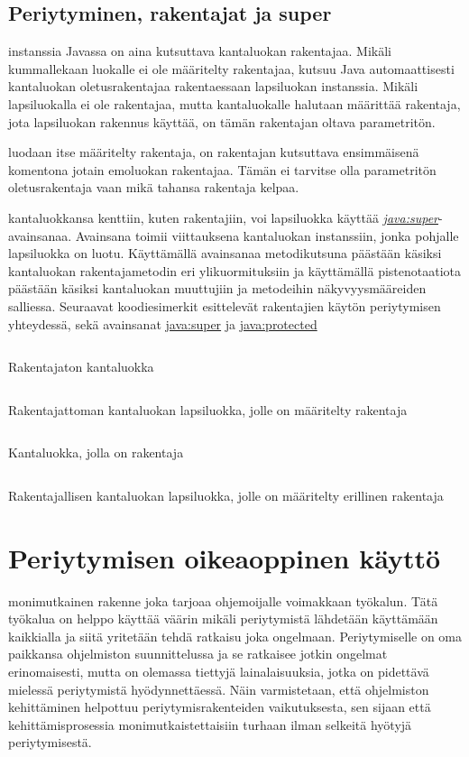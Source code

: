 \documentclass{tufte-book}
\newcommand{\java}[1]{\underline{\gls{java:#1}}}
\newcommand{\newjava}[1]{\textit{\java{#1}}}
\newcommand{\code}[3]{
\begin{listing}
    \inputminted{java}{OhjelmointiopasEsimerkit/src/#1/#2.java}
    \caption{#3}
    \label{Java-#1-#2}
\end{listing}
}
\begin{document}
\subsection{Periytyminen, rakentajat ja super}
\label{super}

 instanssia Javassa on aina kutsuttava kantaluokan rakentajaa.
Mikäli kummallekaan luokalle ei ole määritelty rakentajaa, kutsuu Java automaattisesti kantaluokan
oletusrakentajaa rakentaessaan lapsiluokan instanssia. Mikäli lapsiluokalla ei ole rakentajaa,
mutta kantaluokalle halutaan määrittää rakentaja, jota lapsiluokan rakennus käyttää, on tämän
rakentajan oltava parametritön.

 luodaan itse määritelty rakentaja, on rakentajan kutsuttava
ensimmäisenä komentona jotain emoluokan rakentajaa. Tämän ei tarvitse olla parametritön
oletusrakentaja vaan mikä tahansa rakentaja kelpaa.

 kantaluokkansa kenttiin, kuten rakentajiin, voi lapsiluokka
käyttää \newjava{super}-avainsanaa. Avainsana toimii viittauksena kantaluokan instanssiin, jonka
pohjalle lapsiluokka on luotu. Käyttämällä avainsanaa metodikutsuna päästään käsiksi kantaluokan
rakentajametodin eri ylikuormituksiin ja käyttämällä pistenotaatiota päästään käsiksi kantaluokan
muuttujiin ja metodeihin näkyvyysmääreiden salliessa. Seuraavat koodiesimerkit esittelevät
rakentajien käytön periytymisen yhteydessä, sekä avainsanat \java{super} ja \java{protected}

\code{week6/inheritancewithconstructors}{ParentWithoutConstructor}{Rakentajaton kantaluokka}
\code{week6/inheritancewithconstructors}{ChildOfConstructorless}{Rakentajattoman kantaluokan
lapsiluokka, jolle on määritelty rakentaja}
\code{week6/inheritancewithconstructors}{ParentWithConstructor}{Kantaluokka, jolla on rakentaja}
\code{week6/inheritancewithconstructors}{ChildOfConstructorParent}{Rakentajallisen kantaluokan
lapsiluokka, jolle on määritelty erillinen rakentaja}


\section{Periytymisen oikeaoppinen käyttö}
\label{periytyminen4}

 monimutkainen rakenne joka tarjoaa ohjemoijalle voimakkaan työkalun.
Tätä työkalua on helppo käyttää väärin mikäli periytymistä lähdetään käyttämään kaikkialla ja
siitä yritetään tehdä ratkaisu joka ongelmaan. Periytymiselle on oma paikkansa ohjelmiston
suunnittelussa ja se ratkaisee jotkin ongelmat erinomaisesti, mutta on olemassa tiettyjä
lainalaisuuksia, jotka on pidettävä mielessä periytymistä hyödynnettäessä. Näin varmistetaan, että
ohjelmiston kehittäminen helpottuu periytymisrakenteiden vaikutuksesta, sen sijaan että
kehittämisprosessia monimutkaistettaisiin turhaan ilman selkeitä hyötyjä periytymisestä.
\end{document}
